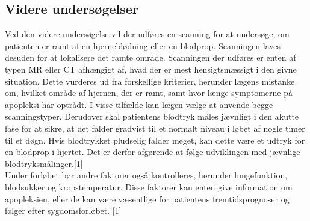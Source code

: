 \subsection{Videre undersøgelser}
Ved den videre undersøgelse vil der udføres en scanning for at undersøge, om patienten er ramt af en hjerneblødning  eller en blodprop. Scanningen laves desuden for at lokalisere det ramte område. Scanningen der udføres er enten af typen MR eller CT afhængigt af, hvad der er mest hensigtsmæssigt i den givne situation. Dette vurderes ud fra forskellige kriterier, herunder lægens mistanke om, hvilket område af hjernen, der er ramt, samt hvor længe symptomerne på apopleksi har optrådt. I visse tilfælde kan lægen vælge at anvende begge scanningstyper.  
Derudover skal patientens blodtryk måles jævnligt i den akutte fase for at sikre, at det falder gradvist til et normalt niveau i løbet af nogle timer til et døgn. Hvis blodtrykket pludselig falder meget, kan dette være et udtryk for en blodprop i hjertet. Det er derfor afgørende at følge udviklingen med jævnlige blodtryksmålinger.[1]
\\
Under forløbet bør andre faktorer også kontrolleres, herunder lungefunktion, blodsukker og kropstemperatur. Disse faktorer kan enten give information om apopleksien, eller de kan være væsentlige for patientens fremtidsprognoser og følger efter sygdomsforløbet.
[1]
\\

